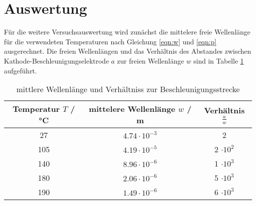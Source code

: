 \section{Auswertung}
\label{sec:Auswertung}
Für die weitere Versuchsauswertung wird zunächst die mittelere freie Wellenlänge für die verwendeten Temperaturen nach Gleichung \ref{eqn:w} und \ref{eqn:p} ausgerechnet. Die freien Wellenlängen und das Verhältnis des Abstandes zwischen Kathode-Beschleunigungselektrode $a$ zur freien Wellenlänge $w$ sind in Tabelle \ref{tab:mitWel} aufgeführt.
\begin{table}
  \centering
  \begin{tabular}{c c c}
    \toprule
    	Temperatur $T$ / °C & mittelere Wellenlänge $w$ / m & Verhältnis $\frac{a}{w}$ \\
    \midrule
    	27  & $4.74 \cdot 10^{-3}$	& 2			\\
      	105 & $4.19 \cdot 10^{-5}$	& 2 $\cdot 10^2$	\\
	140 & $8.96 \cdot 10^{-6}$	& 1 $\cdot 10^3$	\\
	180 & $2.06 \cdot 10^{-6}$	& 5 $\cdot 10^3$	\\
	190 & $1.49 \cdot 10^{-6}$	& 6 $\cdot 10^3$	\\
	\bottomrule
  \end{tabular}
  \caption{mittlere Wellenlänge und Verhältniss zur Beschleunigungsstrecke}
  \label{tab:mitWel}
\end{table}

